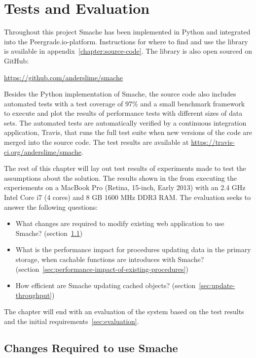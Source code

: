 \chapter{Tests and Evaluation}
\label{chapter:evaluation}

Throughout this project Smache has been implemented in Python and integrated into the Peergrade.io-platform. Instructions for where to find and use the library is available in appendix~\ref{chapter:source-code}. The library is also open sourced on GitHub:

\url{https://github.com/anderslime/smache}

Besides the Python implementation of Smache, the source code also includes automated tests with a test coverage of 97\% and a small benchmark framework to execute and plot the results of performance tests with different sizes of data sets. The automated tests are automatically verified by a continuous integration application, Travis, that runs the full test suite when new versions of the code are merged into the source code. The test results are available at \url{https://travis-ci.org/anderslime/smache}.

The rest of this chapter will lay out test results of experiments made to test the assumptions about the solution. The results shown in the from executing the experiements on a MacBook Pro (Retina, 15-inch, Early 2013) with an 2.4 GHz Intel Core i7 (4 cores) and 8 GB 1600 MHz DDR3 RAM. The evaluation seeks to answer the following questions:

\begin{itemize}
  \item What changes are required to modify existing web application to use Smache? (section~\ref{sec:changes-required-to-cache-with-smache})
  \item What is the performance impact for procedures updating data in the primary storage, when cachable functions are introduces with Smache? (section~\ref{sec:performance-impact-of-existing-procedures})
  \item How efficient are Smache updating cached objects? (section~\ref{sec:update-throughput})
\end{itemize}

The chapter will end with an evaluation of the system based on the test results and the initial requirements~\ref{sec:evaluation}.

\section{Changes Required to use Smache}
\label{sec:changes-required-to-cache-with-smache}

